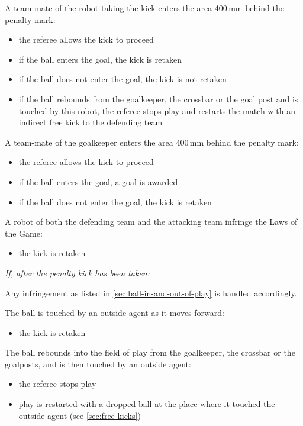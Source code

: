 A team-mate of the robot taking the kick enters the area 400\,mm behind the penalty mark:

\begin{itemize}
\item the referee allows the kick to proceed
\item if the ball enters the goal, the kick is retaken
\item if the ball does not enter the goal, the kick is not retaken
\item if the ball rebounds from the goalkeeper, the crossbar or the goal post and is touched by this robot, the referee stops play and restarts the match with an indirect free kick to the defending team
\end{itemize}

A team-mate of the goalkeeper enters the area 400\,mm behind the penalty mark:

\begin{itemize}
\item the referee allows the kick to proceed
\item if the ball enters the goal, a goal is awarded
\item if the ball does not enter the goal, the kick is retaken
\end{itemize}

A robot of both the defending team and the attacking team infringe the Laws of the Game:

\begin{itemize}
\item the kick is retaken
\end{itemize}

\textit{If, after the penalty kick has been taken:}

Any infringement as listed in \autoref{sec:ball-in-and-out-of-play} is handled accordingly.

The ball is touched by an outside agent as it moves forward:

\begin{itemize}
\item the kick is retaken
\end{itemize}

The ball rebounds into the field of play from the goalkeeper, the crossbar or the goalposts, and is then touched by an outside agent:

\begin{itemize}
\item the referee stops play
\item play is restarted with a dropped ball at the place where it touched the outside agent (see \autoref{sec:free-kicks})
\end{itemize}